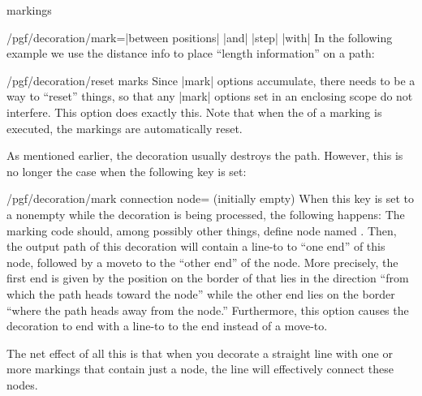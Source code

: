 \begin{decoration}{markings}
\begin{key}{/pgf/decoration/mark=|between positions|
       |and|  |step| 
      |with| }
    In the following example we use the distance info to place
    ``length information'' on a path:
\begin{codeexample}[]
\end{codeexample}
  \end{key}

  \begin{key}{/pgf/decoration/reset marks}
    Since |mark| options accumulate, there needs to be a way to
    ``reset'' things, so that any |mark| options set in an enclosing
    scope do not interfere. This option does exactly this. Note that
    when the  of a marking is executed, the markings are
    automatically reset.
  \end{key}

  As mentioned earlier, the decoration usually destroys the
  path. However, this is no longer the case when the following key is
  set:
  \begin{key}{/pgf/decoration/mark connection node= (initially empty)}
    When this key is set to a nonempty  while the
    decoration is being processed, the following happens: The marking
    code should, among possibly other things, define node named
    . Then, the output path of this decoration will
    contain a line-to to ``one end'' of this node, followed by a
    moveto to the ``other end'' of the node. More precisely, the first
    end is given by the position on the border of 
    that lies in the direction ``from which the path heads toward the
    node'' while the other end lies on the border ``where the path
    heads away from the node.'' Furthermore, this option causes the
    decoration to end with a line-to to the end instead of a move-to.

    The net effect of all this is that when you decorate a straight
    line with one or more markings that contain just a node, the line
    will effectively connect these nodes.


\end{key}
\end{decoration}
